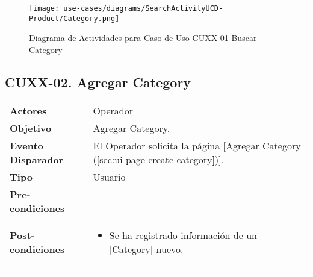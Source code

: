 	\begin{figure}[H]
		\begin{center}
			\label{tab:activity-search-ucd-entity-category}
			\texttt{[image: use-cases/diagrams/SearchActivityUCD-Product/Category.png]}
			\caption{Diagrama de Actividades para Caso de Uso CUXX-01 Buscar Category}
	\end{center}
	\end{figure}
	\clearpage
	\subsection{CUXX-02. Agregar Category} \label{sec:cu-create-Category}
	
	\begin{tabular}{ p{3.5cm} p{11.5cm} }
		\textbf{Actores} & Operador\\
		\textbf{Objetivo} & Agregar Category.\\
		\textbf{Evento Disparador} & El Operador solicita la p\'agina [Agregar Category (\ref{sec:ui-page-create-category})].\\
		\textbf{Tipo} & Usuario\\
		\textbf{Pre-condiciones} &
			\begin{minipage}[t]{0.6\textwidth}
			\begin{itemize}
			\setlength{\itemindent}{-.5cm}
			\end{itemize}
			\end{minipage} \\
		\textbf{Post-condiciones} &
			\begin{minipage}[t]{0.6\textwidth}
			\begin{itemize}[noitemsep,nolistsep]
			\setlength{\itemindent}{-.5cm}
				\item Se ha registrado informaci\'on de un [Category] nuevo.
			\end{itemize}
			\end{minipage} \\
		\\
	\end{tabular}
	

